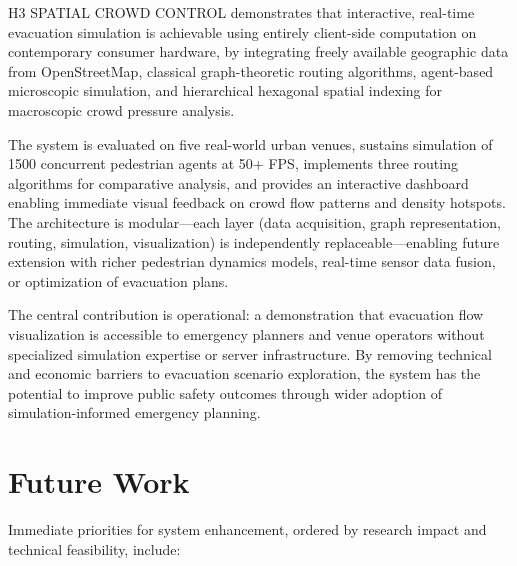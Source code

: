 \documentclass[conference]{IEEEtran}
\begin{document}
H3 SPATIAL CROWD CONTROL demonstrates that interactive, real-time evacuation simulation is achievable using entirely client-side computation on contemporary consumer hardware, by integrating freely available geographic data from OpenStreetMap, classical graph-theoretic routing algorithms, agent-based microscopic simulation, and hierarchical hexagonal spatial indexing for macroscopic crowd pressure analysis.

The system is evaluated on five real-world urban venues, sustains simulation of 1500 concurrent pedestrian agents at 50+ FPS, implements three routing algorithms for comparative analysis, and provides an interactive dashboard enabling immediate visual feedback on crowd flow patterns and density hotspots. The architecture is modular—each layer (data acquisition, graph representation, routing, simulation, visualization) is independently replaceable—enabling future extension with richer pedestrian dynamics models, real-time sensor data fusion, or optimization of evacuation plans.

The central contribution is operational: a demonstration that evacuation flow visualization is accessible to emergency planners and venue operators without specialized simulation expertise or server infrastructure. By removing technical and economic barriers to evacuation scenario exploration, the system has the potential to improve public safety outcomes through wider adoption of simulation-informed emergency planning.

\section*{Future Work}

Immediate priorities for system enhancement, ordered by research impact and technical feasibility, include:
\end{document}
